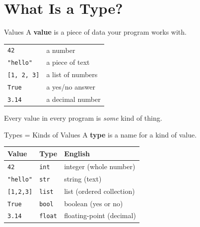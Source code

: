 \documentclass[aspectratio=169,10pt]{beamer}
\begin{document}
\section{What Is a Type?}

\begin{frame}{Values}
A \textbf{value} is a piece of data your program works with.
\vspace{0.5em}

\begin{center}
\begin{tabular}{ll}
\texttt{42}          & a number \\
\texttt{"hello"}     & a piece of text \\
\texttt{[1, 2, 3]}   & a list of numbers \\
\texttt{True}        & a yes/no answer \\
\texttt{3.14}        & a decimal number \\
\end{tabular}
\end{center}
\vspace{0.5em}
Every value in every program is \emph{some} kind of thing.
\end{frame}

\begin{frame}{Types = Kinds of Values}
A \textbf{type} is a name for a kind of value.
\vspace{0.5em}

\begin{center}
\begin{tabular}{lll}
\textbf{Value}     & \textbf{Type}  & \textbf{English} \\
\hline
\texttt{42}        & \texttt{int}   & integer (whole number) \\
\texttt{"hello"}   & \texttt{str}   & string (text) \\
\texttt{[1,2,3]}   & \texttt{list}  & list (ordered collection) \\
\texttt{True}      & \texttt{bool}  & boolean (yes or no) \\
\texttt{3.14}      & \texttt{float} & floating-point (decimal) \\
\end{tabular}
\end{center}
\end{frame}
\end{document}
